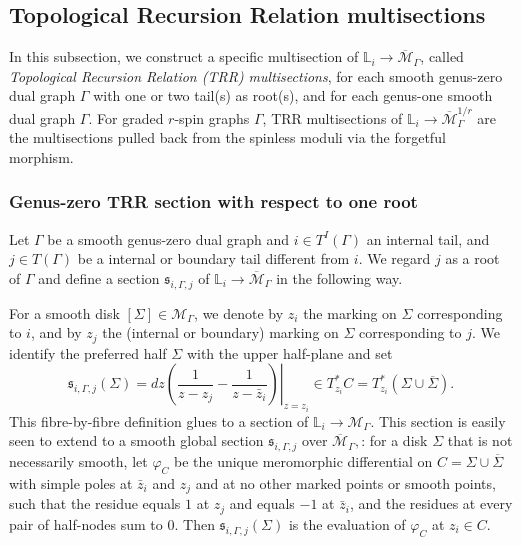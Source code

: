\documentclass[11pt]{amsart}
\theoremstyle{definition}
\theoremstyle{remark}
\newcommand{\<}{\left<}
\renewcommand{\>}{\right>}
\numberwithin{equation}{section}
\def\Mbar{{\overline{\mathcal M}}}
\begin{document}
\subsection{Topological Recursion Relation multisections}\label{sec def of trr sections}

In this subsection, we construct a specific multisection of $\mathbb L_i\to \Mbar_{\Gamma}$, called \textit{Topological Recursion Relation (TRR) multisections}, for each smooth genus-zero dual graph $\Gamma$ with one or two tail(s) as root(s), and for each genus-one smooth dual graph $\Gamma$. For graded $r$-spin graphs $\Gamma$, TRR multisections of $\mathbb L_i\to \Mbar_{\Gamma}^{1/r}$  are the multisections pulled back from the spinless moduli via the forgetful morphism.

\subsubsection{Genus-zero TRR section with respect to one root}
Let $\Gamma$ be a smooth genus-zero dual graph and $i\in T^I(\Gamma)$ an internal tail, and $j\in T(\Gamma)$ be a internal or boundary tail different from $i$. We regard $j$ as a root of $\Gamma$ and define a section $\mathfrak s_{i,\Gamma,j}$ of $\mathbb L_i \to \Mbar_{\Gamma}$ in the following way.

For a smooth disk $[\Sigma]\in \mathcal M^{}_\Gamma$, we denote by $z_i$ the marking on $\Sigma$ corresponding to $i$, and by $z_j$ the (internal or boundary) marking on $\Sigma$ corresponding to $j$. We identify the preferred half $\Sigma$ with the upper half-plane and set
\begin{equation}\label{eq trr section}
\mathfrak s_{i,\Gamma,j}\left(\Sigma\right) = dz\left.\left(\frac{1}{z - z_j}-\frac{1}{z-\bar{z}_i}\right)\right|_{z = z_i} \in T_{z_i}^*C = T_{z_i}^*(\Sigma\cup \overline{\Sigma}).
\end{equation}
This fibre-by-fibre definition glues to a section of $\mathbb{L}_i\to\mathcal M^{}_\Gamma$. This section is easily seen to extend to a smooth global section $\mathfrak s_{i,\Gamma,j}$ over $\Mbar^{}_\Gamma,$: for a disk $\Sigma$ that is not necessarily smooth,  
let $\varphi_C$ be the unique meromorphic differential on $C=\Sigma\cup \overline{\Sigma}$ with simple poles at $\bar{z}_i$ and $z_j$ and at no other marked points or smooth points, such that the residue equals $1$ at $z_j$ and equals $-1$ at $\bar{z}_i$, and the residues at every pair of half-nodes sum to $0$.
Then $\mathfrak s_{i,\Gamma,j}(\Sigma)$ is the evaluation of $\varphi_C$ at $z_i\in C$. 
\end{document}
